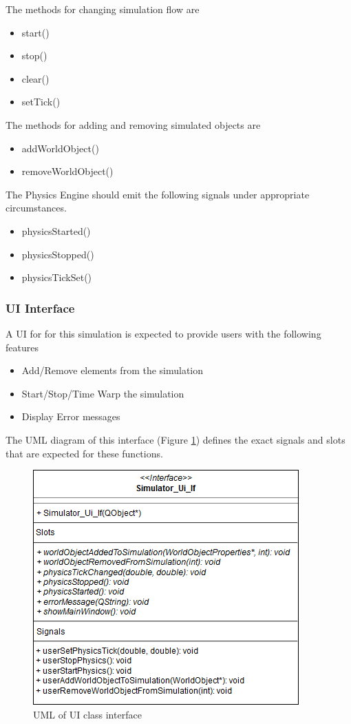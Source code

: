   The methods for changing simulation flow are
  \begin{itemize}
  	\item start()
  	\item stop()
  	\item clear()
  	\item setTick()
  \end{itemize}
  
  The methods for adding and removing simulated objects are
  \begin{itemize}
  	\item addWorldObject()
  	\item removeWorldObject()
  \end{itemize}
  
  The Physics Engine should emit the following signals under appropriate circumstances.
  \begin{itemize}
  	\item physicsStarted()
  	\item physicsStopped()
  	\item physicsTickSet()
  \end{itemize}
  
  \subsubsection*{UI Interface}
  A UI for for this simulation is expected to provide users with the following features
  \begin{itemize}
  	\item Add/Remove elements from the simulation
  	\item Start/Stop/Time Warp the simulation
  	\item Display Error messages
  \end{itemize}
  
  The UML diagram of this interface (Figure \ref{uml:ui_if}) defines the exact signals and slots that are expected for these functions.
 \begin{figure}[h]
 	\begin{center}
 	\includegraphics[scale=0.5]{./images_design/uml/Ui_If}
 	\caption{UML of UI class interface\label{uml:ui_if}}
 	\end{center}
 \end{figure}
 
